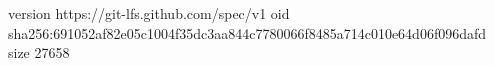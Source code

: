 version https://git-lfs.github.com/spec/v1
oid sha256:691052af82e05c1004f35dc3aa844c7780066f8485a714c010e64d06f096dafd
size 27658
